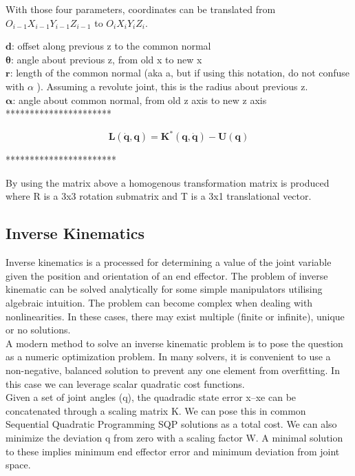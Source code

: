 \documentclass{UoNMCHA}
\numberwithin{equation}{section}
\begin{document}
With those four parameters, coordinates can be translated from $O_{i-1}X_{i-1}Y_{i-1}Z_{i-1}$ to $O_iX_iY_iZ_i$.

$\mathbf{d}$: offset along previous z to the common normal \\
$\mathbf{\theta}$: angle about previous z, from old x to new x\\
$\mathbf{r}$: length of the common normal (aka a, but if using this notation, do not confuse with $\alpha$ ). Assuming a revolute joint, this is the radius about previous z.\\
$\mathbf{\alpha}$: angle about common normal, from old z axis to new z axis\\

**********************

\begin{equation}
\mathbf{L}\left(\dot{\mathbf{q}},\mathbf{q}\right)=\mathbf{K}^\ast\left(\mathbf{q},\dot{\mathbf{q}}\right)-\mathbf{U}\left(\mathbf{q}\right)
\end{equation}

***********************

By using the matrix above a homogenous transformation matrix is produced where R is a 3x3 rotation submatrix and T is a 3x1 translational vector. 

\subsection{Inverse Kinematics}

Inverse kinematics is a processed for determining a value of the joint variable given the position and orientation of an end effector. The problem of inverse kinematic can be solved analytically for some simple manipulators utilising algebraic intuition. The problem can become complex when dealing with nonlinearities. In these cases, there may exist multiple (finite or infinite), unique or no solutions. \\

A modern method to solve an inverse kinematic problem is to pose the question as a numeric optimization problem. In many solvers, it is convenient to use a non-negative, balanced solution to prevent any one element from overfitting. In this case we can leverage scalar quadratic cost functions. \\

Given a set of joint angles (q), the quadradic state error  x–xe can be concatenated through a scaling matrix K. We can pose this in common Sequential Quadratic Programming SQP solutions as a total cost. We can also minimize the deviation q from zero with a scaling factor W. A minimal solution to these implies minimum end effector error and minimum deviation from joint space.  \\
\end{document}
